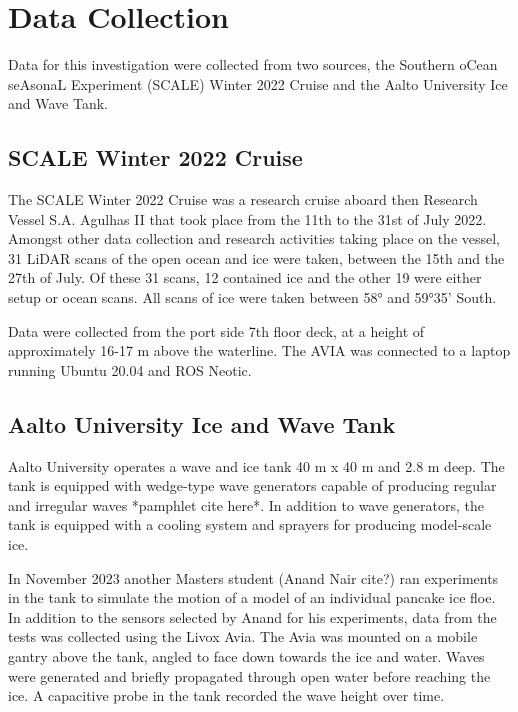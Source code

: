\chapter{Data Collection}
\label{ch:ch4}

Data for this investigation were collected from two sources, the Southern oCean seAsonaL Experiment (SCALE) Winter 2022 Cruise and the Aalto University Ice and Wave Tank.

\section{SCALE Winter 2022 Cruise}
\label{sec:ch4.section1}

The SCALE Winter 2022 Cruise was a research cruise aboard then Research Vessel S.A. Agulhas II that took place from the 11th to the 31st of July 2022. Amongst other data collection and research activities taking place on the vessel, 31 LiDAR scans of the open ocean and ice were taken, between the 15th and the 27th of July. Of these 31 scans, 12 contained ice and the other 19 were either setup or ocean scans. All scans of ice were taken between 58° and 59°35' South.

Data were collected from the port side 7th floor deck, at a height of approximately 16-17 m above the waterline. The AVIA was connected to a laptop running Ubuntu 20.04 and ROS Neotic. 
\section{Aalto University Ice and Wave Tank}
\label{sec:ch4.section2}
Aalto University operates a wave and ice tank 40 m x 40 m and 2.8 m deep. The tank is equipped with wedge-type wave generators capable of producing regular and irregular waves *pamphlet cite here*. In addition to wave generators, the tank is equipped with a cooling system and sprayers for producing model-scale ice.

In November 2023 another Masters student (Anand Nair cite?) ran experiments in the tank to simulate the motion of a model of an individual pancake ice floe. In addition to the sensors selected by Anand for his experiments, data from the tests was collected using the Livox Avia.
The Avia was mounted on a mobile gantry above the tank, angled to face down towards the ice and water. Waves were generated and briefly propagated through open water before reaching the ice. A capacitive probe in the tank recorded the wave height over time.